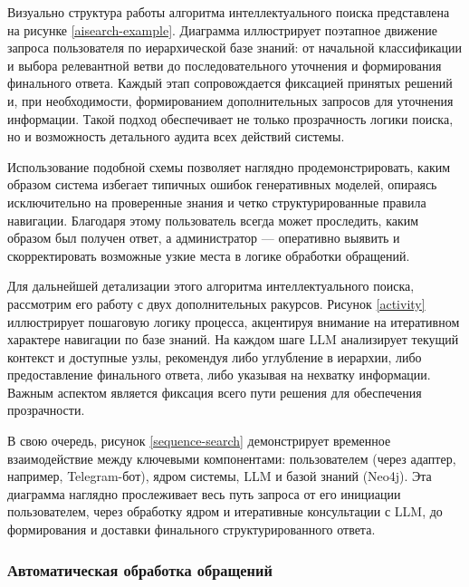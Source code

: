 Визуально структура работы алгоритма интеллектуального поиска представлена на рисунке \ref{aisearch-example}. Диаграмма иллюстрирует поэтапное движение запроса пользователя по иерархической базе знаний: от начальной классификации и выбора релевантной ветви до последовательного уточнения и формирования финального ответа. Каждый этап сопровождается фиксацией принятых решений и, при необходимости, формированием дополнительных запросов для уточнения информации. Такой подход обеспечивает не только прозрачность логики поиска, но и возможность детального аудита всех действий системы.


Использование подобной схемы позволяет наглядно продемонстрировать, каким образом система избегает типичных ошибок генеративных моделей, опираясь исключительно на проверенные знания и четко структурированные правила навигации. Благодаря этому пользователь всегда может проследить, каким образом был получен ответ, а администратор — оперативно выявить и скорректировать возможные узкие места в логике обработки обращений.

Для дальнейшей детализации этого алгоритма интеллектуального поиска, рассмотрим его работу с двух дополнительных ракурсов. Рисунок \ref{activity} иллюстрирует пошаговую логику процесса, акцентируя внимание на итеративном характере навигации по базе знаний. На каждом шаге LLM анализирует текущий контекст и доступные узлы, рекомендуя либо углубление в иерархии, либо предоставление финального ответа, либо указывая на нехватку информации. Важным аспектом является фиксация всего пути решения для обеспечения прозрачности.


В свою очередь, рисунок \ref{sequence-search} демонстрирует временное взаимодействие между ключевыми компонентами: пользователем (через адаптер, например, Telegram-бот), ядром системы, LLM и базой знаний (Neo4j). Эта диаграмма наглядно прослеживает весь путь запроса от его инициации пользователем, через обработку ядром и итеративные консультации с LLM, до формирования и доставки финального структурированного ответа.


\subsubsection{Автоматическая обработка обращений}

